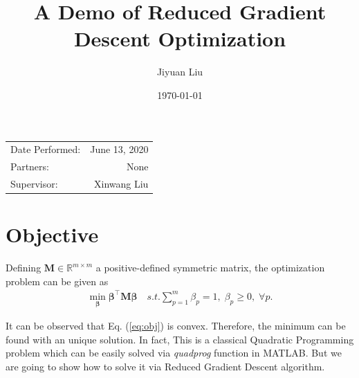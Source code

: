 \documentclass{article}
\title{A Demo of Reduced Gradient Descent Optimization} %
\author{Jiyuan Liu} %
\date{\today} %
\begin{document}
\maketitle %

\begin{center}
\begin{tabular}{l r}
Date Performed: & June 13, 2020 \\ %
Partners: & None \\ %
Supervisor: & Xinwang Liu %
\end{tabular}
\end{center}


\clearpage




\section{Objective}

Defining $\mathbf{M} \in \mathbb{R}^{m\times m}$ a positive-defined symmetric matrix, the optimization problem can be given as 
\begin{equation}\label{eq:obj}
	\begin{split}
		\min_{\boldsymbol{\beta}} \boldsymbol{\beta}^\top\mathbf{M}\boldsymbol{\beta} \quad s.t. \sum_{p=1}^m \beta_p = 1,\; \beta_p\geq 0,\; \forall p.
	\end{split}
\end{equation}

It can be observed that Eq. (\ref{eq:obj}) is convex.
Therefore, the minimum can be found with an unique solution.
In fact, This is a classical Quadratic Programming problem which can be easily solved via \emph{quadprog} function in MATLAB.
But we are going to show how to solve it via Reduced Gradient Descent algorithm. 

\end{document}
